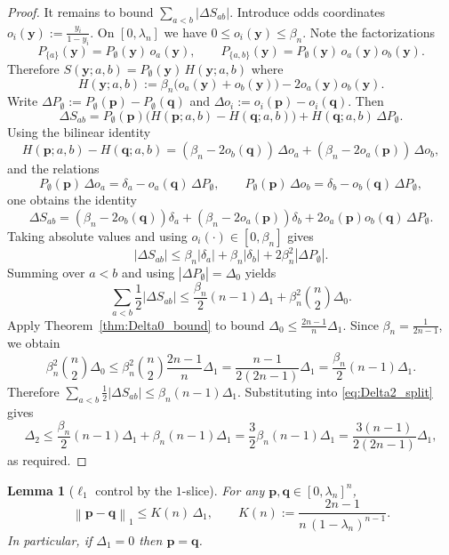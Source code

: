 \documentclass[11pt]{amsart}
\numberwithin{equation}{section}
\newtheorem{lemma}[theorem]{Lemma}
\theoremstyle{definition}
\newcommand{\abs}[1]{\left|#1\right|}
\newcommand{\vct}[1]{\mathbf{#1}}
\newcommand{\pvec}{\vct{p}}
\newcommand{\qvec}{\vct{q}}
\newcommand{\yvec}{\vct{y}}
\newcommand{\normone}[1]{\left\lVert #1 \right\rVert_1}
\newcommand{\lam}{\lambda}
\begin{document}
\begin{proof}
It remains to bound $\sum_{a<b}\abs{\Delta S_{ab}}$.
Introduce odds coordinates $o_i(\yvec):=\frac{y_i}{1-y_i}$.
On $[0,\lam_n]$ we have $0\le o_i(\yvec)\le \beta_n$.
Note the factorizations
\[
P_{\{a\}}(\yvec)=P_\emptyset(\yvec)\,o_a(\yvec),\qquad
P_{\{a,b\}}(\yvec)=P_\emptyset(\yvec)\,o_a(\yvec)o_b(\yvec).
\]
Therefore $S(\yvec;a,b)=P_\emptyset(\yvec)\,H(\yvec;a,b)$ where
\[
H(\yvec;a,b):=\beta_n\big(o_a(\yvec)+o_b(\yvec)\big)-2o_a(\yvec)o_b(\yvec).
\]
Write
$\Delta P_\emptyset:=P_\emptyset(\pvec)-P_\emptyset(\qvec)$
and $\Delta o_i:=o_i(\pvec)-o_i(\qvec)$.
Then
\[
\Delta S_{ab}=P_\emptyset(\pvec)\big(H(\pvec;a,b)-H(\qvec;a,b)\big)+H(\qvec;a,b)\,\Delta P_\emptyset.
\]
Using the bilinear identity
\[
H(\pvec;a,b)-H(\qvec;a,b)
=(\beta_n-2o_b(\qvec))\,\Delta o_a+(\beta_n-2o_a(\pvec))\,\Delta o_b,
\]
and the relations
\[
P_\emptyset(\pvec)\,\Delta o_a=\delta_a-o_a(\qvec)\,\Delta P_\emptyset,
\qquad
P_\emptyset(\pvec)\,\Delta o_b=\delta_b-o_b(\qvec)\,\Delta P_\emptyset,
\]
one obtains the identity
\[
\Delta S_{ab}
=(\beta_n-2o_b(\qvec))\delta_a+(\beta_n-2o_a(\pvec))\delta_b+2o_a(\pvec)o_b(\qvec)\,\Delta P_\emptyset.
\]
Taking absolute values and using $o_i(\cdot)\in[0,\beta_n]$ gives
\[
\abs{\Delta S_{ab}}\le \beta_n\abs{\delta_a}+\beta_n\abs{\delta_b}+2\beta_n^2\abs{\Delta P_\emptyset}.
\]
Summing over $a<b$ and using $\abs{\Delta P_\emptyset}=\Delta_0$ yields
\[
\sum_{a<b}\frac12\abs{\Delta S_{ab}}
\le \frac{\beta_n}{2}(n-1)\Delta_1+\beta_n^2\binom{n}{2}\Delta_0.
\]
Apply Theorem~\ref{thm:Delta0_bound} to bound $\Delta_0\le \frac{2n-1}{n}\Delta_1$.
Since $\beta_n=\frac{1}{2n-1}$, we obtain
\[
\beta_n^2\binom{n}{2}\Delta_0
\le \beta_n^2\binom{n}{2}\frac{2n-1}{n}\Delta_1
=\frac{n-1}{2(2n-1)}\Delta_1
=\frac{\beta_n}{2}(n-1)\Delta_1.
\]
Therefore $\sum_{a<b}\frac12\abs{\Delta S_{ab}}\le \beta_n(n-1)\Delta_1$.
Substituting into \eqref{eq:Delta2_split} gives
\[
\Delta_2\le \frac{\beta_n}{2}(n-1)\Delta_1+\beta_n(n-1)\Delta_1
=\frac32\beta_n(n-1)\Delta_1
=\frac{3(n-1)}{2(2n-1)}\Delta_1,
\]
as required.
\end{proof}

\begin{lemma}[$\ell_1$ control by the $1$-slice]\label{lem:l1_vs_Delta1}
For any $\pvec,\qvec\in[0,\lam_n]^n$,
\[
\normone{\pvec-\qvec}\le K(n)\,\Delta_1,
\qquad
K(n):=\frac{2n-1}{n\,(1-\lam_n)^{n-1}}.
\]
In particular, if $\Delta_1=0$ then $\pvec=\qvec$.
\end{lemma}
\end{document}
